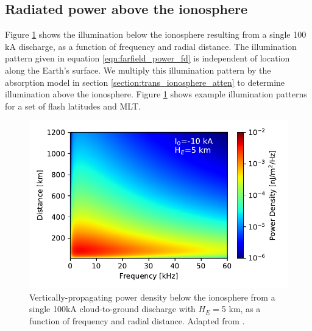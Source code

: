 \subsection{Radiated power above the ionosphere}
Figure \ref{fig:illumination} shows the illumination below the ionosphere resulting from a single 100 kA discharge, as a function of frequency and radial distance. The illumination pattern given in equation \eqref{eqn:farfield_power_fd} is independent of location along the Earth's surface. We multiply this illumination pattern by the absorption model in section \ref{section:trans_ionosphere_atten} to determine illumination above the ionosphere. Figure \ref{fig:illumination} shows example illumination patterns for a set of flash latitudes and MLT.

\begin{figure}[h!]
\begin{center}
\includegraphics{figures/power_scaling_below_ionosphere.pdf}
\caption[Illumination pattern below the ionosphere]{Vertically-propagating power density below the ionosphere from a single 100kA cloud-to-ground discharge with $H_E= $5 km, as a function of frequency and radial distance. Adapted from \cite{Marshall2011}.}
\label{fig:illumination}
\end{center}
\end{figure}
